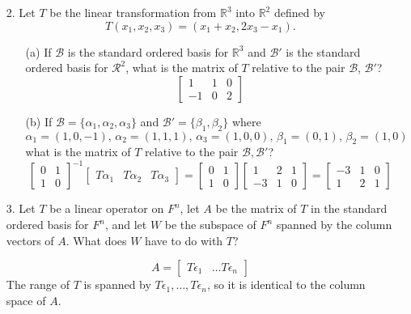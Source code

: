 \documentclass{article}
\begin{document}
\begin{enumerate}[listparindent=\parindent]
\item[2.] Let \(T\) be the linear transformation from \(\mathbb{R}^3\) into \(\mathbb{R}^2\) defined by
    \[ T(x_1, x_2, x_3) = (x_1 + x_2, 2x_3 - x_1). \]
    \begin{enumerate}[listparindent=\parindent]
        \item[(a)] If \(\mathcal{B}\) is the standard ordered basis for \(\mathbb{R}^3\) and
            \(\mathcal{B}'\) is the standard ordered basis for \(\mathcal{R}^2\), what is the matrix of \(T\) relative to the pair \(\mathcal{B}\), \(\mathcal{B}'\)?
            \[ \begin{bmatrix} 1 & 1 & 0 \\ -1 & 0 & 2 \end{bmatrix} \]
        \item[(b)] If \(\mathcal{B} = \{\alpha_1, \alpha_2, \alpha_3\}\) and \(\mathcal{B}' = \{\beta_1, \beta_2\}\) where
            \[ \alpha_1 = (1, 0, -1),\, \alpha_2 = (1, 1, 1),\, \alpha_3 = (1, 0, 0),\, \beta_1 = (0, 1),\, \beta_2 = (1, 0) \]
            what is the matrix of \(T\) relative to the pair \(\mathcal{B}, \mathcal{B}'\)?
            \[
                \begin{bmatrix} 0 & 1 \\ 1 & 0 \end{bmatrix}^{-1}
                \begin{bmatrix} T\alpha_1 & T\alpha_2 & T\alpha_3 \end{bmatrix}
                =
                \begin{bmatrix} 0 & 1 \\ 1 & 0 \end{bmatrix}
                \begin{bmatrix} 1 & 2 & 1 \\ -3 & 1 & 0 \end{bmatrix}
                =
                \begin{bmatrix} -3 & 1 & 0 \\ 1 & 2 & 1 \end{bmatrix}
            \]
    \end{enumerate}

\item[3.] Let \(T\) be a linear operator on \(F^n\), let \(A\) be the matrix of \(T\) in the standard ordered basis for \(F^n\),
    and let \(W\) be the subspace of \(F^n\) spanned by the column vectors of \(A\). What does \(W\) have to do with \(T\)?

\[ A = \begin{bmatrix} T\epsilon_1 & \dots T\epsilon_n \end{bmatrix} \]
The range of \(T\) is spanned by \(T\epsilon_1, \dots, T\epsilon_n\), so it is identical to the column space of \(A\).


\end{enumerate}
\end{document}
